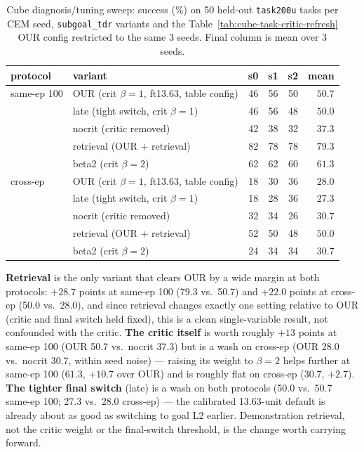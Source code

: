 \documentclass[11pt]{article}
\begin{document}
\begin{table}[t]
\centering
\small
\caption{Cube diagnosis/tuning sweep: success (\%) on 50 held-out \texttt{task200u} tasks per
CEM seed, \texttt{subgoal\_tdr} variants and the Table~\ref{tab:cube-task-critic-refresh} OUR
config restricted to the same 3 seeds. Final column is mean over 3 seeds.}
\label{tab:cube-variants}
\begin{tabular}{llrrrr}
\toprule
protocol & variant & s0 & s1 & s2 & mean \\
\midrule
same-ep 100 & OUR (crit $\beta{=}1$, ft13.63, table config)  & 46 & 56 & 50 & $50.7$ \\
            & late (tight switch, crit $\beta{=}1$)           & 46 & 56 & 48 & $50.0$ \\
            & nocrit (critic removed)                          & 42 & 38 & 32 & $37.3$ \\
            & retrieval (OUR $+$ retrieval)                    & 82 & 78 & 78 & $79.3$ \\
            & beta2 (crit $\beta{=}2$)                          & 62 & 62 & 60 & $61.3$ \\
\midrule
cross-ep    & OUR (crit $\beta{=}1$, ft13.63, table config)  & 18 & 30 & 36 & $28.0$ \\
            & late (tight switch, crit $\beta{=}1$)           & 18 & 28 & 36 & $27.3$ \\
            & nocrit (critic removed)                          & 32 & 34 & 26 & $30.7$ \\
            & retrieval (OUR $+$ retrieval)                    & 52 & 50 & 48 & $50.0$ \\
            & beta2 (crit $\beta{=}2$)                          & 24 & 34 & 34 & $30.7$ \\
\bottomrule
\end{tabular}
\end{table}

\textbf{Retrieval} is the only variant that clears OUR by a wide margin at both protocols:
$+28.7$ points at same-ep 100 (79.3 vs.\ 50.7) and $+22.0$ points at cross-ep (50.0 vs.\ 28.0),
and since retrieval changes exactly one setting relative to OUR (critic and final switch held
fixed), this is a clean single-variable result, not confounded with the critic. \textbf{The
critic itself} is worth roughly $+13$ points at same-ep 100 (OUR 50.7 vs.\ nocrit 37.3) but is a
wash on cross-ep (OUR 28.0 vs.\ nocrit 30.7, within seed noise) --- raising its weight to
$\beta=2$ helps further at same-ep 100 ($61.3$, $+10.7$ over OUR) and is roughly flat on
cross-ep ($30.7$, $+2.7$). \textbf{The tighter final switch} (late) is a wash on both protocols
(50.0 vs.\ 50.7 same-ep 100; 27.3 vs.\ 28.0 cross-ep) --- the calibrated 13.63-unit default is
already about as good as switching to goal L2 earlier. Demonstration retrieval, not the critic
weight or the final-switch threshold, is the change worth carrying forward.
\end{document}
